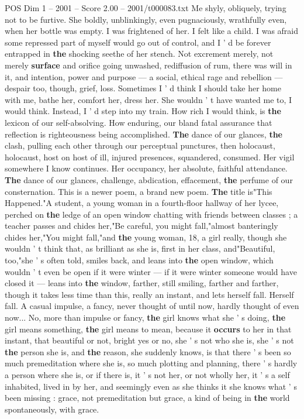 \begin{textsample}{POS Dim 1 – 2001 – Score 2.00 – 2001/t000083.txt}
Me shyly, obliquely, trying not to be furtive.
She boldly, unblinkingly, even pugnaciously, wrathfully even, when her bottle was empty.
I was frightened of her.
I felt like a child.
I was afraid some repressed part of myself would go out of control, and I ' d be forever entrapped in \textbf{the} shocking seethe of her stench.
Not excrement merely, not merely \textbf{surface} and orifice going unwashed, rediffusion of rum, there was will in it, and intention, power and purpose — a social, ethical rage and rebellion — despair too, though, grief, loss.
Sometimes I ' d think I should take her home with me, bathe her, comfort her, dress her.
She wouldn ' t have wanted me to, I would think.
Instead, I ' d step into my train.
How rich I would think, is \textbf{the} lexicon of our self-absolving.
How enduring, our bland fatal assurance that reflection is righteousness being accomplished. \textbf{The} dance of our glances, \textbf{the} clash, pulling each other through our perceptual punctures, then holocaust, holocaust, host on host of ill, injured presences, squandered, consumed.
Her vigil somewhere I know continues.
Her occupancy, her absolute, faithful attendance. \textbf{The} dance of our glances, challenge, abdication, effacement, \textbf{the} perfume of our consternation.
This is a newer poem, a brand new poem. \textbf{The} title is"This Happened."A student, a young woman in a fourth-floor hallway of her lycee, perched on \textbf{the} ledge of an open window chatting with friends between classes ; a teacher passes and chides her,"Be careful, you might fall,"almost banteringly chides her,"You might fall,"and \textbf{the} young woman, 18, a girl really, though she wouldn ' t think that, as brilliant as she is, first in her class, and"Beautiful, too,"she ' s often told, smiles back, and leans into \textbf{the} open window, which wouldn ' t even be open if it were winter — if it were winter someone would have closed it — leans into \textbf{the} window, farther, still smiling, farther and farther, though it takes less time than this, really an instant, and lets herself fall.
Herself fall.
A casual impulse, a fancy, never thought of until now, hardly thought of even now...
No, more than impulse or fancy, \textbf{the} girl knows what she ' s doing, \textbf{the} girl means something, \textbf{the} girl means to mean, because it \textbf{occurs} to her in that instant, that beautiful or not, bright yes or no, she ' s not who she is, she ' s not \textbf{the} person she is, and \textbf{the} reason, she suddenly knows, is that there ' s been so much premeditation where she is, so much plotting and planning, there ' s hardly a person where she is, or if there is, it ' s not her, or not wholly her, it ' s a self inhabited, lived in by her, and seemingly even as she thinks it she knows what ' s been missing : grace, not premeditation but grace, a kind of being in \textbf{the} world spontaneously, with grace.

\end{textsample}
